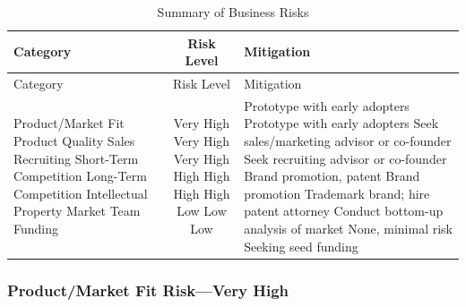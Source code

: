 \documentclass[10pt,openany]{book}
\begin{document}
\newpage

\begin{longtable}[]{@{}lcl@{}}
\caption{Summary of Business Risks}\tabularnewline
\toprule
\begin{minipage}[b]{0.26\columnwidth}\raggedright
Category\strut
\end{minipage} & \begin{minipage}[b]{0.16\columnwidth}\centering
Risk Level\strut
\end{minipage} & \begin{minipage}[b]{0.49\columnwidth}\raggedright
Mitigation\strut
\end{minipage}\tabularnewline
\midrule
\endfirsthead
\toprule
\begin{minipage}[b]{0.26\columnwidth}\raggedright
Category\strut
\end{minipage} & \begin{minipage}[b]{0.16\columnwidth}\centering
Risk Level\strut
\end{minipage} & \begin{minipage}[b]{0.49\columnwidth}\raggedright
Mitigation\strut
\end{minipage}\tabularnewline
\midrule
\endhead
\begin{minipage}[t]{0.26\columnwidth}\raggedright
Product/Market Fit Product Quality Sales Recruiting Short-Term
Competition Long-Term Competition Intellectual Property Market Team
Funding\strut
\end{minipage} & \begin{minipage}[t]{0.16\columnwidth}\centering
Very High Very High Very High High High High High Low Low Low\strut
\end{minipage} & \begin{minipage}[t]{0.49\columnwidth}\raggedright
Prototype with early adopters Prototype with early adopters Seek
sales/marketing advisor or co-founder Seek recruiting advisor or
co-founder Brand promotion, patent Brand promotion Trademark brand; hire
patent attorney Conduct bottom-up analysis of market None, minimal risk
Seeking seed funding\strut
\end{minipage}\tabularnewline
\bottomrule
\end{longtable}

\hypertarget{productmarket-fit-riskvery-high}{%
\subsubsection{Product/Market Fit Risk---Very
High}\label{productmarket-fit-riskvery-high}}
\end{document}
